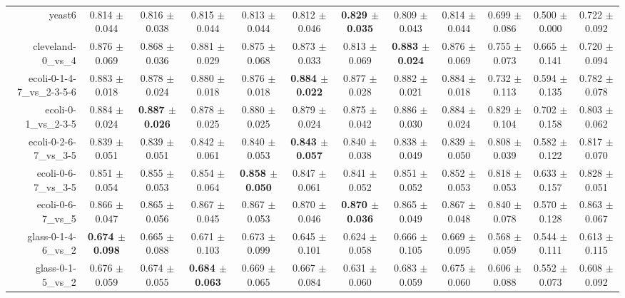 \begin{table}[!ht]
{\begin{tabular}{r c c c c c c c c c c c}
yeast6 & 0.814 $\pm$ 0.044 & 0.816 $\pm$ 0.038 & 0.815 $\pm$ 0.044 & 0.813 $\pm$ 0.044 & 0.812 $\pm$ 0.046 & \textbf{0.829 $\pm$ 0.035} & 0.809 $\pm$ 0.043 & 0.814 $\pm$ 0.044 & 0.699 $\pm$ 0.086 & 0.500 $\pm$ 0.000 & 0.722 $\pm$ 0.092 \\
cleveland-0\_vs\_4 & 0.876 $\pm$ 0.069 & 0.868 $\pm$ 0.036 & 0.881 $\pm$ 0.029 & 0.875 $\pm$ 0.068 & 0.873 $\pm$ 0.033 & 0.813 $\pm$ 0.069 & \textbf{0.883 $\pm$ 0.024} & 0.876 $\pm$ 0.069 & 0.755 $\pm$ 0.073 & 0.665 $\pm$ 0.141 & 0.720 $\pm$ 0.094 \\
ecoli-0-1-4-7\_vs\_2-3-5-6 & 0.883 $\pm$ 0.018 & 0.878 $\pm$ 0.024 & 0.880 $\pm$ 0.018 & 0.876 $\pm$ 0.018 & \textbf{0.884 $\pm$ 0.022} & 0.877 $\pm$ 0.028 & 0.882 $\pm$ 0.021 & 0.884 $\pm$ 0.018 & 0.732 $\pm$ 0.113 & 0.594 $\pm$ 0.135 & 0.782 $\pm$ 0.078 \\
ecoli-0-1\_vs\_2-3-5 & 0.884 $\pm$ 0.024 & \textbf{0.887 $\pm$ 0.026} & 0.878 $\pm$ 0.025 & 0.880 $\pm$ 0.025 & 0.879 $\pm$ 0.024 & 0.875 $\pm$ 0.042 & 0.886 $\pm$ 0.030 & 0.884 $\pm$ 0.024 & 0.829 $\pm$ 0.104 & 0.702 $\pm$ 0.158 & 0.803 $\pm$ 0.062 \\
ecoli-0-2-6-7\_vs\_3-5 & 0.839 $\pm$ 0.051 & 0.839 $\pm$ 0.051 & 0.842 $\pm$ 0.061 & 0.840 $\pm$ 0.053 & \textbf{0.843 $\pm$ 0.057} & 0.840 $\pm$ 0.038 & 0.838 $\pm$ 0.049 & 0.839 $\pm$ 0.050 & 0.808 $\pm$ 0.039 & 0.582 $\pm$ 0.122 & 0.817 $\pm$ 0.070 \\
ecoli-0-6-7\_vs\_3-5 & 0.851 $\pm$ 0.054 & 0.855 $\pm$ 0.053 & 0.854 $\pm$ 0.064 & \textbf{0.858 $\pm$ 0.050} & 0.847 $\pm$ 0.061 & 0.841 $\pm$ 0.052 & 0.851 $\pm$ 0.052 & 0.852 $\pm$ 0.053 & 0.818 $\pm$ 0.053 & 0.633 $\pm$ 0.157 & 0.828 $\pm$ 0.051 \\
ecoli-0-6-7\_vs\_5 & 0.866 $\pm$ 0.047 & 0.865 $\pm$ 0.056 & 0.867 $\pm$ 0.045 & 0.867 $\pm$ 0.053 & 0.870 $\pm$ 0.046 & \textbf{0.870 $\pm$ 0.036} & 0.865 $\pm$ 0.049 & 0.867 $\pm$ 0.048 & 0.840 $\pm$ 0.078 & 0.570 $\pm$ 0.128 & 0.863 $\pm$ 0.067 \\
glass-0-1-4-6\_vs\_2 & \textbf{0.674 $\pm$ 0.098} & 0.665 $\pm$ 0.088 & 0.671 $\pm$ 0.103 & 0.673 $\pm$ 0.099 & 0.645 $\pm$ 0.101 & 0.624 $\pm$ 0.058 & 0.666 $\pm$ 0.105 & 0.669 $\pm$ 0.095 & 0.568 $\pm$ 0.059 & 0.544 $\pm$ 0.111 & 0.613 $\pm$ 0.115 \\
glass-0-1-5\_vs\_2 & 0.676 $\pm$ 0.059 & 0.674 $\pm$ 0.055 & \textbf{0.684 $\pm$ 0.063} & 0.669 $\pm$ 0.065 & 0.667 $\pm$ 0.084 & 0.631 $\pm$ 0.060 & 0.683 $\pm$ 0.059 & 0.675 $\pm$ 0.060 & 0.606 $\pm$ 0.088 & 0.552 $\pm$ 0.073 & 0.608 $\pm$ 0.092 \\

\end{tabular}}
\end{table}
